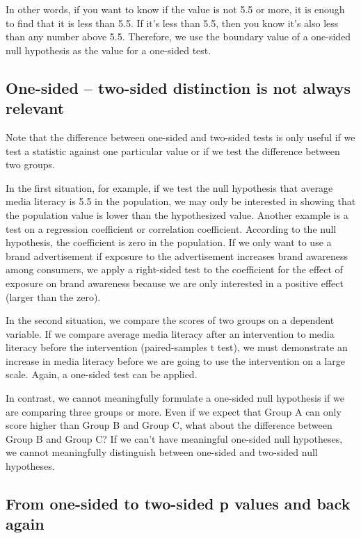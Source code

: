 \documentclass[a4paper]{book}
\theoremstyle{definition}
\theoremstyle{definition}
\theoremstyle{definition}
\theoremstyle{remark}
\begin{document}
In other words, if you want to know if the value is not 5.5 or more, it
is enough to find that it is less than 5.5. If it's less than 5.5, then
you know it's also less than any number above 5.5. Therefore, we use the
boundary value of a one-sided null hypothesis as the value for a
one-sided test.

\subsection{One-sided -- two-sided distinction is not always
relevant}\label{one-sided-two-sided-distinction-is-not-always-relevant}

Note that the difference between one-sided and two-sided tests is only
useful if we test a statistic against one particular value or if we test
the difference between two groups.

In the first situation, for example, if we test the null hypothesis that
average media literacy is 5.5 in the population, we may only be
interested in showing that the population value is lower than the
hypothesized value. Another example is a test on a regression
coefficient or correlation coefficient. According to the null
hypothesis, the coefficient is zero in the population. If we only want
to use a brand advertisement if exposure to the advertisement increases
brand awareness among consumers, we apply a right-sided test to the
coefficient for the effect of exposure on brand awareness because we are
only interested in a positive effect (larger than the zero).

In the second situation, we compare the scores of two groups on a
dependent variable. If we compare average media literacy after an
intervention to media literacy before the intervention (paired-samples t
test), we must demonstrate an increase in media literacy before we are
going to use the intervention on a large scale. Again, a one-sided test
can be applied.

In contrast, we cannot meaningfully formulate a one-sided null
hypothesis if we are comparing three groups or more. Even if we expect
that Group A can only score higher than Group B and Group C, what about
the difference between Group B and Group C? If we can't have meaningful
one-sided null hypotheses, we cannot meaningfully distinguish between
one-sided and two-sided null hypotheses.

\subsection{From one-sided to two-sided p values and back
again}\label{from-one-sided-to-two-sided-p-values-and-back-again}
\end{document}
